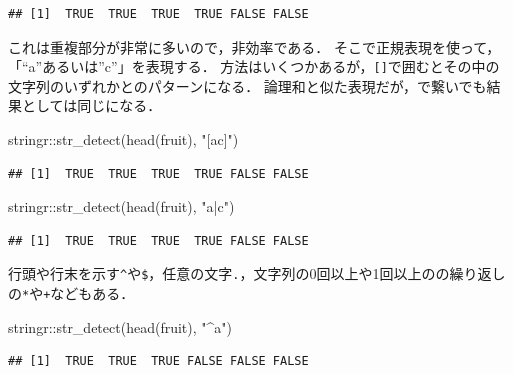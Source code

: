 \documentclass[
]{article}
\newenvironment{Shaded}{\begin{snugshade}}{\end{snugshade}}
\newcommand{\FunctionTok}[1]{\textcolor[rgb]{0.00,0.00,0.00}{#1}}
\newcommand{\NormalTok}[1]{#1}
\newcommand{\SpecialCharTok}[1]{\textcolor[rgb]{0.00,0.00,0.00}{#1}}
\newcommand{\StringTok}[1]{\textcolor[rgb]{0.31,0.60,0.02}{#1}}
\begin{document}
\begin{verbatim}
## [1]  TRUE  TRUE  TRUE  TRUE FALSE FALSE
\end{verbatim}

これは重複部分が非常に多いので，非効率である．
そこで正規表現を使って，「``a''あるいは''c''」を表現する．
方法はいくつかあるが，\texttt{{[}{]}}で囲むとその中の文字列のいずれかとのパターンになる．
論理和と似た表現だが，\texttt{\textbar{}}で繋いでも結果としては同じになる．

\begin{Shaded}
\begin{Highlighting}[]
\NormalTok{stringr}\SpecialCharTok{::}\FunctionTok{str\_detect}\NormalTok{(}\FunctionTok{head}\NormalTok{(fruit), }\StringTok{"[ac]"}\NormalTok{)}
\end{Highlighting}
\end{Shaded}

\begin{verbatim}
## [1]  TRUE  TRUE  TRUE  TRUE FALSE FALSE
\end{verbatim}

\begin{Shaded}
\begin{Highlighting}[]
\NormalTok{stringr}\SpecialCharTok{::}\FunctionTok{str\_detect}\NormalTok{(}\FunctionTok{head}\NormalTok{(fruit), }\StringTok{"a|c"}\NormalTok{)}
\end{Highlighting}
\end{Shaded}

\begin{verbatim}
## [1]  TRUE  TRUE  TRUE  TRUE FALSE FALSE
\end{verbatim}

行頭や行末を示す\texttt{\^{}}や\texttt{\$}，任意の文字\texttt{.}，文字列の0回以上や1回以上のの繰り返しの\texttt{*}や\texttt{+}などもある．

\begin{Shaded}
\begin{Highlighting}[]
\NormalTok{stringr}\SpecialCharTok{::}\FunctionTok{str\_detect}\NormalTok{(}\FunctionTok{head}\NormalTok{(fruit), }\StringTok{"\^{}a"}\NormalTok{)}
\end{Highlighting}
\end{Shaded}

\begin{verbatim}
## [1]  TRUE  TRUE  TRUE FALSE FALSE FALSE
\end{verbatim}

\begin{Shaded}
\end{Shaded}
\end{document}
